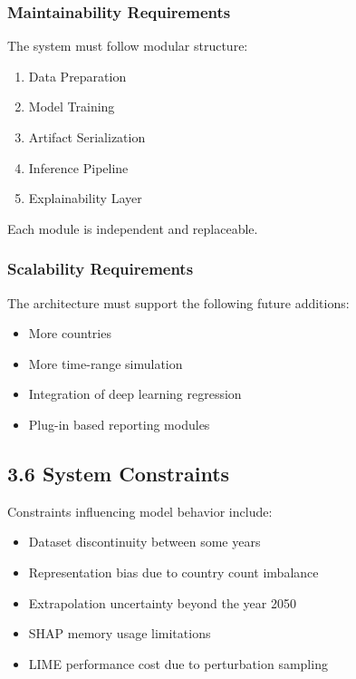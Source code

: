 \documentclass[12pt, a4paper]{article}
\begin{document}
\subsubsection{\textbf{Maintainability Requirements}}

The system must follow modular structure:

\begin{enumerate}
\item Data Preparation  
\item Model Training  
\item Artifact Serialization  
\item Inference Pipeline  
\item Explainability Layer  
\end{enumerate}

Each module is independent and replaceable.

\subsubsection{\textbf{Scalability Requirements}}

The architecture must support the following future additions:

\begin{itemize}
\item More countries  
\item More time-range simulation  
\item Integration of deep learning regression  
\item Plug-in based reporting modules  
\end{itemize}

\subsection{\textbf{3.6 System Constraints}}

Constraints influencing model behavior include:

\begin{itemize}
\item Dataset discontinuity between some years
\item Representation bias due to country count imbalance
\item Extrapolation uncertainty beyond the year 2050
\item SHAP memory usage limitations
\item LIME performance cost due to perturbation sampling
\end{itemize}
\end{document}
